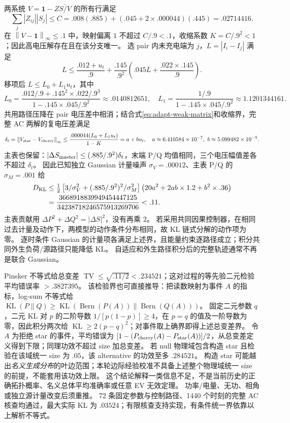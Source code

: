 \documentclass[UTF8,fontset=fandol,11pt,a4paper]{ctexart}
\newcommand{\norm}[1]{\left\lVert#1\right\rVert}
\begin{document}
两系统 $V=\mathbf1-Z\overline{S/V}$ 的所有行满足
\[
 \sum_j|Z_{ij}||S_j|\le C=.008(.885)+(.045+2\times.000044)(.445)=.02714416.
\]
在 $\norm{V-\mathbf1}_\infty\le .1$ 中，映射偏离 $1$ 不超过 $C/.9<.1$，收缩系数 $K=C/.9^2<1$；因此高电压解存在且在该分支唯一。
选 pair 内未充电端为 $j$，$L=|I_i-I_j|$ 满足
\[
 L\le\frac{.012+u_t}{.9}+\frac{.145}{.9^2}
       \left(.045L+\frac{.022\times.145}{.9}\right).
\]
移项后 $L\le L_0+L_1u_t$，其中
\[
 L_0=\frac{.012/.9+.145^2\times.022/.9^3}{1-.145\times.045/.9^2}
 \approx .0140812651,\quad
 L_1=\frac{1/.9}{1-.145\times.045/.9^2}\approx1.1201344161.
\]
共用路径压降在 pair 电压差中相消；结合式\eqref{eq:adapt-weak-matrix}和收缩界，完整 AC 两解的复电压差满足
\begin{equation}
 \delta_t=\norm{V_{\rm star}-V_{\rm cherry}}_\infty
 \le\frac{.000044(L_0+L_1u_t)}{1-K}=a+bu_t,
 \quad a\approx6.410584\times10^{-7},\ b\approx5.099482\times10^{-5}.
\end{equation}
主表也保留：$|\Delta S_{\rm master}|\le(.885/.9^2)\delta_t$，末端 P/Q 均值相同，三个电压幅值差各不超过 $\delta_t$。
因此已知独立 Gaussian 计量噪声 $\sigma_V=.00012$、主表 P/Q 的 $\sigma_M=.001$ 给
\begin{equation}
 \begin{aligned}
 D_{\rm KL}&\le\tfrac12\left[3/\sigma_V^2+(.885/.9^2)^2/\sigma_M^2\right]
 \left(20a^2+2ab\times1.2+b^2\times.36\right)\\
 &=\frac{3668918839949454447125}{34238718246575913269706}<.11.\label{eq:adapt-weak-KL}
 \end{aligned}
\end{equation}
主表贡献用 $\Delta P^2+\Delta Q^2=|\Delta S|^2$，没有再乘 $2$。
若采用共同因果控制器，在相同过去计量及动作下，两模型的动作条件分布相同，故 KL 链式分解的动作项为零。
逐时条件 Gaussian 的计量项各满足上述界，且能量约束逐路径成立；积分共同外生负荷/源路径只能降低 KL。
自适应和外生路径积分后的完整轨迹通常不再是联合 Gaussian。

Pinsker 不等式给总变差 $\operatorname{TV}\le\sqrt{.11/2}<.234521$；这对过程的等先验二元检验平均错误率 $>.3827395$。
该检验界也可直接推导：把读数映射为事件 $A$ 的指标，log-sum 不等式给 $\operatorname{KL}(P\|Q)\ge\operatorname{KL}(\operatorname{Bern}(P(A))\|\operatorname{Bern}(Q(A)))$。
固定二元参数 $q$，二元 KL 对 $p$ 的二阶导数 $1/[p(1-p)]\ge4$，在 $p=q$ 的值及一阶导数为零，因此积分两次给 $\operatorname{KL}\ge2(p-q)^2$；对事件取上确界即得上述总变差界。
令 $A$ 为拒绝 star 的事件，平均错误为 $[1-(P_{\rm cherry}(A)-P_{\rm star}(A))]/2$，从总变差定义得到下限；同理功效不超过 size 加总变差。
若 null 物理域包含构造 star 且检验在该域统一 size 为 $.05$，该 alternative 的功效至多 $.284521$。
构造 star 可能越出\emph{名义生成分布}的叶边范围；本轮边际经验校准不具备上述整个物理域统一 size 的前提，不能套用该功效上限。
这个结论解释一类信息不足，不是当前历史的正确拓扑概率、名义总体平均准确率或任意 EV 无效定理。
功率/电量、无功、相角或独立源计量改变后须重推。
72 条固定参数与控制路径、1440 个时刻的完整 AC 核查均通过，最大实际 KL 为 $.03524$；有限核查支持实现，有条件统一界依靠以上解析不等式。
\end{document}

